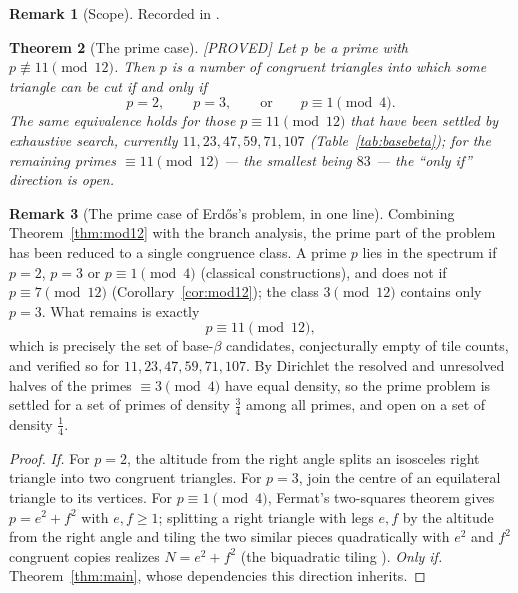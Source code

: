 \documentclass[11pt,reqno]{amsart}
\theoremstyle{plain}
\newtheorem{theorem}{Theorem}
\theoremstyle{definition}
\newtheorem{remark}[theorem]{Remark}
\newcommand{\lab}[1]{\hfill\textnormal{\footnotesize\textsc{[#1]}}}
\begin{document}
\begin{remark}[Scope]\label{rem:ladder}
Recorded in \cite{Obstructions}.
\end{remark}

\begin{theorem}[The prime case]\label{thm:primefull}\lab{PROVED}
Let $p$ be a prime with $p\not\equiv11\pmod{12}$. Then $p$ is a number of congruent triangles into
which some triangle can be cut if and only if
\[
p=2,\qquad p=3,\qquad\text{or}\qquad p\equiv1\pmod4 .
\]
The same equivalence holds for those $p\equiv11\pmod{12}$ that have been settled by exhaustive search,
currently $11,23,47,59,71,107$ (Table~\ref{tab:basebeta}); for the remaining primes
$\equiv11\pmod{12}$ --- the smallest being $83$ --- the ``only if'' direction is open.
\end{theorem}

\begin{remark}[The prime case of Erd\H os's problem, in one line]\label{rem:primeline}
Combining Theorem~\ref{thm:mod12} with the branch analysis, the prime part of the problem has been
reduced to a single congruence class. A prime $p$ lies in the spectrum if $p=2$, $p=3$ or
$p\equiv1\pmod4$ (classical constructions), and does not if $p\equiv7\pmod{12}$
(Corollary~\ref{cor:mod12}); the class $3\pmod{12}$ contains only $p=3$. What remains is exactly
\[
p\equiv11\pmod{12},
\]
which is precisely the set of base-$\beta$ candidates, conjecturally empty of tile counts, and
verified so for $11,23,47,59,71,107$. By Dirichlet the resolved and unresolved halves of the primes
$\equiv3\pmod4$ have equal density, so the prime problem is settled for a set of primes of density
$\tfrac34$ among all primes, and open on a set of density $\tfrac14$.
\end{remark}

\begin{proof}
\emph{If.} For $p=2$, the altitude from the right angle splits an isosceles right triangle into two
congruent triangles. For $p=3$, join the centre of an equilateral triangle to its vertices. For
$p\equiv1\pmod4$, Fermat's two-squares theorem gives $p=e^2+f^2$ with $e,f\ge1$; splitting a right
triangle with legs $e,f$ by the altitude from the right angle and tiling the two similar pieces
quadratically with $e^2$ and $f^2$ congruent copies realizes $N=e^2+f^2$ (the biquadratic tiling
\cite{Soifer, BeesonIso}). \emph{Only if.} Theorem~\ref{thm:main}, whose dependencies this
direction inherits.
\end{proof}
\end{document}
